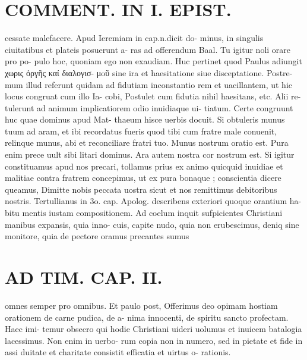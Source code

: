 \documentclass{article}
\begin{document}
\begin{pages}
\section*{COMMENT. IN I. EPIST. }\pstart cessate malefacere. Apud Ieremiam in cap.n.dicit do- minus, in singulis ciuitatibus et plateis posuerunt a- ras ad offerendum Baal. Tu igitur noli orare pro po- pulo hoc, quoniam ego non exaudiam. Huc pertinet quod Paulus adiungit χωρις ὀργῆς καί διαλογισ- μoῦ sine ira et haesitatione siue disceptatione. Postre- mum illud referunt quidam ad fidutiam inconstantio rem et uacillantem, ut hic locus congruat cum illo Ia- cobi, Postulet cum fidutia nihil haesitans, etc. Alii re- tulerunt ad animum implicatiorem odio inuidiaque ui- tiatum. Certe congruunt huc quae dominus apud Mat- thaeum hisce uerbis docuit. Si obtuleris munus tuum ad aram, et ibi recordatus fueris quod tibi cum fratre male conuenit, relinque munus, abi et reconciliare fratri tuo. Munus nostrum oratio est. Pura enim prece uult sibi litari dominus. Ara autem nostra cor nostrum est. Si igitur constituamus apud nos precari, tollamus prius ex animo quicquid inuidiae et malitiae contra fratrem concepimus, ut ex pura bonaque ; conscientia dicere queamus, Dimitte nobis peccata uostra sicut et nos remittimus debitoribus nostris. Tertullianus in 3o. cap. Apolog. describens exteriori quoque orantium ha- bitu mentis iustam compositionem. Ad coelum inquit sufpicientes Christiani manibus expansis, quia inno- cuis, capite nudo, quia non erubescimus, deniq sine monitore, quia de pectore oramus precantes sumus  \pend
\section*{AD TIM. CAP. II. }
\marginpar{[ p.120 ]}\pstart omnes semper pro omnibus. Et paulo post, Offerimus deo opimam hostiam orationem de carne pudica, de a- nima innocenti, de spiritu sancto profectam. Haec imi- temur obsecro qui hodie Christiani uideri uolumus et inuicem batalogia lacessimus. Non enim in uerbo- rum copia non in numero, sed in pietate et fide in assi duitate et charitate consistit efficatia et uirtus o- rationis.  \pend
{}
{}

\end{pages}
\end{document}
